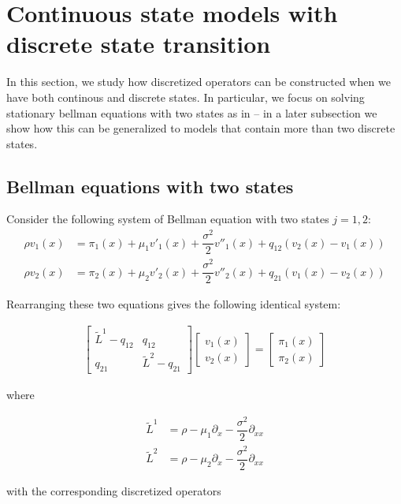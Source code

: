 \documentclass[11pt]{article}
\theoremstyle{definition}
\begin{document}
\section{Continuous state models with discrete state transition}
In this section, we study how discretized operators can be constructed when we have both continous and discrete states. In particular, we focus on solving stationary bellman equations with two states as in \cite{achdou17} -- in a later subsection we show how this can be generalized to models that contain more than two discrete states.

\subsection{Bellman equations with two states}
Consider the following system of Bellman equation with two states $j = 1, 2$:
\begin{align} 
	\rho v_{1}(x) &= \pi_1(x)+\mu_1 v'_1 (x) + \dfrac{\sigma^2}{2} v''_1 (x) +q_{12}\left(v_{2}(x)-v_{1}(x) \right) \\ \rho v_{2}(x) &=
	\pi_2(x)+\mu_2 v'_2 (x) + \dfrac{\sigma^2}{2} v''_2 (x) +q_{21}\left(v_{1}(x)-v_{2}(x)\right)
\end{align}

Rearranging these two equations gives the following identical system:

\begin{align} 
\begin{bmatrix}
\tilde{L}^1 - q_{12} & q_{12} \\ q_{21} & \tilde{L}^2 - q_{21}
\end{bmatrix}
\begin{bmatrix}
v_1 (x) \\ v_2(x)
\end{bmatrix}
 =
\begin{bmatrix}
\pi_1 (x) \\
\pi_2 (x)
\end{bmatrix}\label{eq:continuous-and-discrete-system}
\end{align}

where

\begin{align}
\tilde{L}^1 &= \rho - \mu_1 \partial_{x} - \dfrac{\sigma^2}{2} \partial_{xx} \\
\tilde{L}^2 &= \rho - \mu_2 \partial_{x} - \dfrac{\sigma^2}{2} \partial_{xx}
\end{align}

with the corresponding discretized operators
\end{document}
